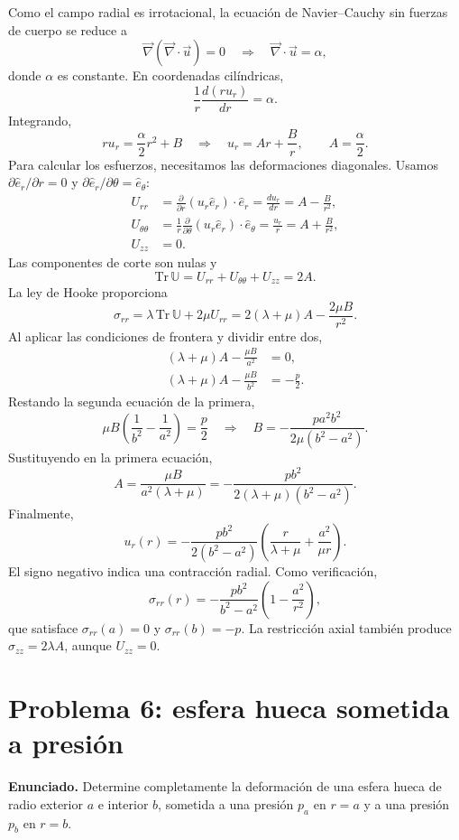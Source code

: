 \documentclass[a4paper]{article}
\begin{document}
Como el campo radial es irrotacional, la ecuación de Navier--Cauchy sin fuerzas de cuerpo se reduce a
\[
\vec\nabla(\vec\nabla\cdot\vec u)=0
\quad\Longrightarrow\quad
\vec\nabla\cdot\vec u=\alpha,
\]
donde $\alpha$ es constante. En coordenadas cilíndricas,
\[
\frac{1}{r}\frac{d(ru_r)}{dr}=\alpha.
\]
Integrando,
\[
ru_r=\frac{\alpha}{2}r^2+B
\quad\Longrightarrow\quad
u_r=Ar+\frac{B}{r},
\qquad A=\frac{\alpha}{2}.
\]
Para calcular los esfuerzos, necesitamos las deformaciones diagonales. Usamos $\partial\hat e_r/\partial r=0$ y $\partial\hat e_r/\partial\theta=\hat e_\theta$:
\[
\begin{aligned}
U_{rr}
&=\frac{\partial}{\partial r}(u_r\hat e_r)\cdot\hat e_r
=\frac{du_r}{dr}=A-\frac{B}{r^2},\\
U_{\theta\theta}
&=\frac{1}{r}\frac{\partial}{\partial\theta}(u_r\hat e_r)\cdot\hat e_\theta
=\frac{u_r}{r}=A+\frac{B}{r^2},\\
U_{zz}&=0.
\end{aligned}
\]
Las componentes de corte son nulas y
\[
\mathrm{Tr}\,\mathbb U=U_{rr}+U_{\theta\theta}+U_{zz}=2A.
\]
La ley de Hooke proporciona
\[
\sigma_{rr}=\lambda\,\mathrm{Tr}\,\mathbb U+2\mu U_{rr}
=2(\lambda+\mu)A-\frac{2\mu B}{r^2}.
\]
Al aplicar las condiciones de frontera y dividir entre dos,
\[
\begin{aligned}
(\lambda+\mu)A-\frac{\mu B}{a^2}&=0,\\
(\lambda+\mu)A-\frac{\mu B}{b^2}&=-\frac{p}{2}.
\end{aligned}
\]
Restando la segunda ecuación de la primera,
\[
\mu B\left(\frac{1}{b^2}-\frac{1}{a^2}\right)=\frac{p}{2}
\quad\Longrightarrow\quad
B=-\frac{pa^2b^2}{2\mu(b^2-a^2)}.
\]
Sustituyendo en la primera ecuación,
\[
A=\frac{\mu B}{a^2(\lambda+\mu)}
=-\frac{pb^2}{2(\lambda+\mu)(b^2-a^2)}.
\]
Finalmente,
\[
\boxed{u_r(r)=-\frac{pb^2}{2(b^2-a^2)}
\left(\frac{r}{\lambda+\mu}+\frac{a^2}{\mu r}\right)}.
\]
El signo negativo indica una contracción radial. Como verificación,
\[
\sigma_{rr}(r)=-\frac{pb^2}{b^2-a^2}
\left(1-\frac{a^2}{r^2}\right),
\]
que satisface $\sigma_{rr}(a)=0$ y $\sigma_{rr}(b)=-p$. La restricción axial también produce $\sigma_{zz}=2\lambda A$, aunque $U_{zz}=0$.




\section{Problema 6: esfera hueca sometida a presión}

\textbf{Enunciado.} Determine completamente la deformación de una esfera hueca de radio exterior $a$ e interior $b$, sometida a una presión $p_a$ en $r=a$ y a una presión $p_b$ en $r=b$.
\end{document}
